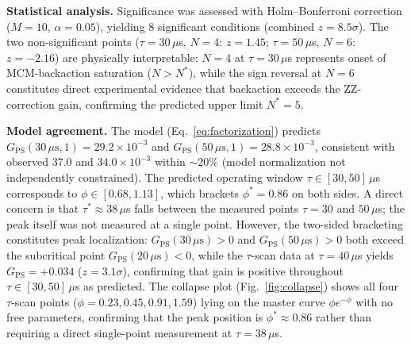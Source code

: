 \documentclass[10pt,twocolumn]{article}
\newcommand{\GPS}{G_{\mathrm{PS}}}
\newcommand{\taustar}{\tau^*}
\begin{document}
\textbf{Statistical analysis.}
Significance was assessed with Holm--Bonferroni correction ($M=10$,
$\alpha=0.05$), yielding 8 significant conditions
(combined $z = 8.5\sigma$).
The two non-significant points ($\tau=30\,\mu$s, $N=4$: $z=1.45$;
$\tau=50\,\mu$s, $N=6$: $z=-2.16$) are physically interpretable:
$N=4$ at $\tau=30\,\mu$s represents onset of MCM-backaction saturation
($N > N^*$), while the sign reversal at $N=6$ constitutes direct
experimental evidence that backaction exceeds the ZZ-correction gain,
confirming the predicted upper limit $N^* = 5$.

\textbf{Model agreement.}
The model (Eq.~\ref{eq:factorization}) predicts
$\GPS(30\,\mu\mathrm{s}, 1) = 29.2 \times 10^{-3}$ and
$\GPS(50\,\mu\mathrm{s}, 1) = 28.8 \times 10^{-3}$,
consistent with observed $37.0$ and $34.0\times 10^{-3}$ within
$\sim 20\%$ (model normalization not independently constrained).
The predicted operating window $\tau \in [30,50]\,\mu$s corresponds to
$\phi \in [0.68, 1.13]$, which brackets $\phi^* = 0.86$ on both sides.
A direct concern is that $\taustar \approx 38\,\mu$s falls between the
measured points $\tau = 30$ and $50\,\mu$s; the peak itself was not
measured at a single point.
However, the two-sided bracketing constitutes peak localization:
$\GPS(30\,\mu\mathrm{s}) > 0$ and $\GPS(50\,\mu\mathrm{s}) > 0$
both exceed the subcritical point $\GPS(20\,\mu\mathrm{s}) < 0$,
while the $\tau$-scan data at $\tau = 40\,\mu$s yields
$\GPS = +0.034$ ($z = 3.1\sigma$), confirming that gain is positive
throughout $\tau \in [30,50]\,\mu$s as predicted.
The collapse plot (Fig.~\ref{fig:collapse}) shows all four
$\tau$-scan points ($\phi = 0.23, 0.45, 0.91, 1.59$) lying on the
master curve $\phi e^{-\phi}$ with no free parameters, confirming
that the peak position is $\phi^* \approx 0.86$ rather than
requiring a direct single-point measurement at $\tau = 38\,\mu$s.
\end{document}
